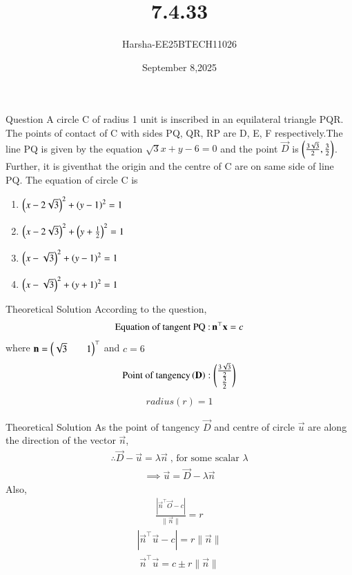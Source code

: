 \documentclass{beamer}
\title %
{7.4.33}
\date{September 8,2025}
\author %
{Harsha-EE25BTECH11026}
\begin{document}
\frame{\titlepage}


\begin{frame}{Question}
A circle C of radius 1 unit is inscribed in an equilateral triangle PQR. The points of contact of C with sides PQ, QR, RP are D, E, F respectively.The line PQ is given by the equation $\sqrt{3}x+y-6=0$ and the point $\vec{D}$ is $\brak{\frac{3\sqrt{3}}{2},\frac{3}{2}}$. Further, it is giventhat the origin and the centre of C are on same side of line PQ. The equation of circle C is
\begin{enumerate}
    \item $\brak{x-2\sqrt{3}}^2+\brak{y-1}^2=1$
    \item $\brak{x-2\sqrt{3}}^2+\brak{y+\frac{1}{2}}^2=1$
    \item $\brak{x-\sqrt{3}}^2+\brak{y-1}^2=1$
    \item $\brak{x-\sqrt{3}}^2+\brak{y+1}^2=1$
\end{enumerate}
\end{frame}

\begin{frame}{Theoretical Solution}
According to the question,
\begin{align}
    \text{Equation of tangent PQ :\,}\vec{n}^{\top}\vec{x}=c
\end{align}
where $\vec{n}=\myvec{\sqrt{3}&&1}^{\top}$ and $c=6$
\begin{align}
    \text{Point of tangency}\brak{\vec{D}}:\myvec{\frac{3\sqrt{3}}{2}\\\frac{3}{2}}
\end{align}
\begin{align}
    radius(r)=1
\end{align}
\end{frame}

\begin{frame}{Theoretical Solution}
As the point of tangency $\vec{D}$ and centre of circle $\vec{u}$  are along the direction of the vector $\vec{n}$,
\begin{align}
    \therefore \vec{D}-\vec{u}=\lambda\vec{n}\;\text{, for some scalar $\lambda$}
\end{align}
\begin{align}
    \implies \vec{u}=\vec{D}-\lambda\vec{n}
\end{align}
Also,
\begin{align}
    \frac{|\vec{n}^{\top}\vec{O}-c|}{\|\vec{n}\|}=r
\end{align}
\begin{align}
    |\vec{n}^{\top}\vec{u}-c|=r\|\vec{n}\|
\end{align}
\begin{align}
    \vec{n}^{\top}\vec{u}=c \pm r\|\vec{n}\|
\end{align}
\end{frame}
\end{document}

